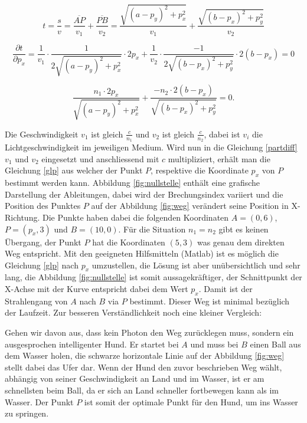 \begin{refsection}
\begin{equation}\label{tbest}
t=\dfrac{s}{v}=\dfrac{\overline{AP}}{v_{1}}+\dfrac{\overline{PB}}{v_{2}}= 
\dfrac{\sqrt{(a-p_{y})^{2}+p_{x}^{2}}}{v_{1}}+ 
\dfrac{\sqrt{(b-p_{x})^{2}+p_{y}^{2}}}{v_{2}}
\end{equation}

\begin{equation}\label{partdiff}
\dfrac{\partial t}{\partial p_{x}}=
\dfrac{1}{v_{1}}\cdot \dfrac{1}{2 \sqrt{(a-p_{y})^{2}+p_{x}^{2}}}\cdot 2p_{x} +
\dfrac{1}{v_{2}}\cdot \dfrac{-1}{2 \sqrt{(b-p_{x})^{2}+p_{y}^{2}}}\cdot 2(b-p_{x})= 0
\end{equation}

\begin{equation}\label{glp}
\dfrac{n_{1}\cdot 2p_{x} }{\sqrt{(a-p_{y})^{2}+p_{x}^{2}}}+
\dfrac{-n_{2}\cdot 2(b-p_{x})}{\sqrt{(b-p_{x})^{2}+p_{y}^{2}}}= 0.
\end{equation}

Die Geschwindigkeit $ v_{1}$ ist gleich $\frac{c}{n_{1}} $ und $ v_{2}$
ist gleich $\frac{c}{n_{2}}$, dabei ist $v_{i}$ die Lichtgeschwindigkeit
im jeweiligen Medium. Wird nun in die Gleichung \eqref{partdiff} $ v_{1}$
und $ v_{2}$ eingesetzt und anschliessend mit $c$ multipliziert, erhält
man die Gleichung \eqref{glp} aus welcher der Punkt $P$, respektive die
Koordinate $p_{x}$ von $P$ bestimmt werden kann.
Abbildung \ref{fig:nullstelle} enthält eine grafische Darstellung der
Ableitungen, dabei wird der Brechungsindex variiert und die Position des
Punktes $P$ auf der Abbildung \ref{fig:weg} verändert seine Position
in X-Richtung. Die  Punkte haben dabei die folgenden Koordinaten $A =
(0,6)$, $P=(p_{x},3)$ und $B=(10,0)$. Für die Situation $n_{1}=n_{2}$
gibt es keinen Übergang, der Punkt $P$ hat die Koordinaten $(5,3)$
was genau dem direkten Weg entspricht. Mit den geeigneten Hilfsmitteln
(Matlab) ist es möglich die Gleichung \eqref{glp} nach $p_{x}$
umzustellen, die Lösung ist aber unübersichtlich und sehr lang,
die Abbildung \ref{fig:nullstelle} ist somit aussagekräftiger, der
Schnittpunkt der X-Achse mit der Kurve entspricht dabei dem Wert $p_{x}$.
Damit ist der Strahlengang von $A$ nach $B$ via $P$ bestimmt. Dieser
Weg ist minimal bezüglich der Laufzeit. \newline
Zur besseren Verständlichkeit noch eine kleiner Vergleich:

Gehen wir davon aus, dass kein Photon den Weg zurücklegen muss, sondern
ein ausgesprochen intelligenter Hund. Er startet bei $A$ und muss bei $B$
einen Ball aus dem Wasser holen, die schwarze horizontale Linie auf der
Abbildung \ref{fig:weg} stellt dabei das Ufer dar. Wenn der Hund den
zuvor beschrieben Weg wählt, abhängig von seiner Geschwindigkeit an
Land und im Wasser, ist er am schnellsten beim Ball, da er sich an Land
schneller fortbewegen kann als im Wasser. Der Punkt $P$ ist somit der
optimale Punkt für den Hund, um ins Wasser zu springen.


\end{refsection}
